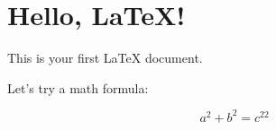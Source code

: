 \documentclass{article}
\begin{document}
\section*{Hello, LaTeX!}

This is your first LaTeX document.

Let’s try a math formula:

\[
a^2 + b^2 = c^22
\]
\end{document}
